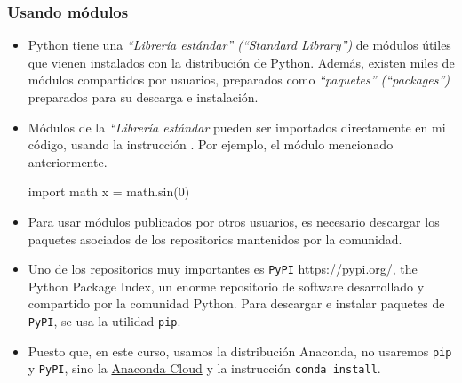 \documentclass[handout,9pt]{beamer}
\begin{document}
\begin{frame}[fragile]
  \frametitle{Usando módulos}
  \begin{itemize}
  \item<1-> Python tiene una  \textit{ ``Librería estándar''
      (``Standard Library'')} de módulos útiles que vienen instalados
    con la distribución de Python. Además, existen miles de módulos
    compartidos por usuarios, preparados como \textit{``paquetes''
      (``packages'')} preparados para su descarga e instalación.
  \item<2-> Módulos de la  \textit{``Librería estándar} pueden ser
    importados directamente en mi código, usando  la instrucción
    . Por ejemplo, el módulo   mencionado anteriormente.
    \begin{pyverbatim}
import math
x = math.sin(0)
    \end{pyverbatim}
  \item<3-> Para usar módulos publicados por otros usuarios, es
    necesario descargar los paquetes asociados de los repositorios
    mantenidos por la comunidad.
  \item<4-> Uno de los repositorios muy importantes es  {\tt \tt PyPI}
    \href{https://pypi.org/}{https://pypi.org/}, the Python Package
    Index, un enorme repositorio de software desarrollado y compartido
    por la comunidad Python. Para descargar e instalar paquetes de
    {\tt PyPI}, se usa la utilidad  {\tt pip}. 
  \item<5-> Puesto que, en este curso, usamos la distribución
    Anaconda, no usaremos 
    {\tt pip} y {\tt PyPI}, sino la 
    \href{https://anaconda.org/}{Anaconda Cloud} y la instrucción  {\tt conda
      install}.
  \end{itemize}
\end{frame}
\end{document}
